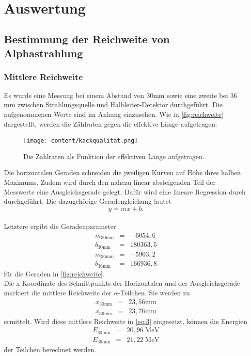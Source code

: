 \section{Auswertung}
\label{sec:Auswertung}

\subsection{Bestimmung der Reichweite von Alphastrahlung}
\subsubsection*{Mittlere Reichweite}
Es wurde eine Messung bei einem Abstand von $30$mm sowie eine zweite bei $36$mm zwischen 
Strahlungsquelle und Halbleiter-Detektor durchgeführt. 
Die aufgenommenen Werte sind im Anhang einzusehen.
Wie in \autoref{fig:reichweite} dargestellt, werden die Zählraten gegen die effektive Länge 
aufgetragen.\\
\begin{figure}[H]
  \centering
  \texttt{[image: content/kackqualität.png]}
  \caption{Die Zählraten als Funktion der effektiven Länge aufgetragen.}
  \label{fig:reichweite}
\end{figure}
Die horizontalen Geraden schneiden die jweiligen Kurven auf Höhe ihres halben
Maximums. Zudem wird durch den nahezu linear absteigenden Teil der Messwerte eine 
Ausgleichsgerade gelegt. Dafür wird eine lineare Regression durch \cite{numpy} durchgeführt. Die 
dazugehörige Geradengleichung lautet
\begin{equation}
  y = mx + b.
  \label{eq:linreg}
\end{equation}\\
Letztere ergibt die Geradenparameter
\begin{eqnarray}
  m_{\mathrm{30mm}} &=&  -6054,6  \nonumber  \\
  b_{\mathrm{30mm}} &=&  180363,5 \nonumber  \\
  m_{\mathrm{36mm}} &=&  -5903,2  \nonumber  \\
  b_{\mathrm{36mm}} &=&  166936,8 \nonumber
\end{eqnarray}
für die Geraden in \autoref{fig:reichweite}.\\
Die x-Koordinate des Schnittpunkts der Horizontalen und der Ausgleichsgerade markiert die 
mittlere Reichweite der $\alpha$-Teilchen. 
Sie werden zu 
\begin{eqnarray}
  x_{\mathrm{30mm}} &=& 23,56 \mathrm{mm} \nonumber  \\
  x_{\mathrm{36mm}} &=& 23,76 \mathrm{mm} \nonumber  
\end{eqnarray}
ermittelt.
Wird diese mittlere Reichweite in \autoref{eq:3} eingesetzt, können die Energien 
\begin{eqnarray}
  E_{\mathrm{30mm}} &=& 20,96 \; \mathrm{MeV} \nonumber  \\
  E_{\mathrm{36mm}} &=& 21,22 \; \mathrm{MeV} \nonumber  
\end{eqnarray}
der Teilchen berechnet werden. 




